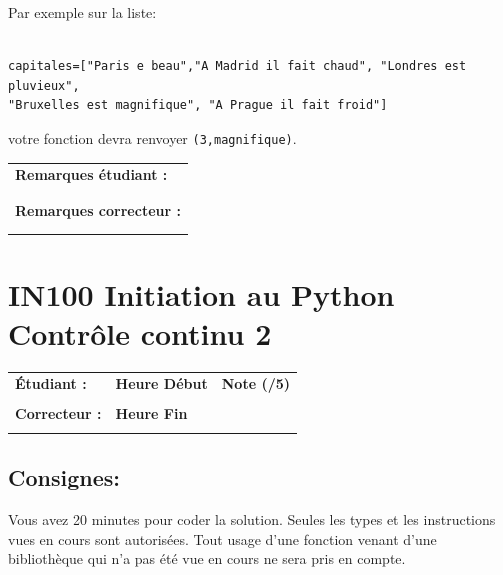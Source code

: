 \documentclass[a4paper,11pt]{article}
\begin{document}
Par exemple sur la liste:
\begin{verbatim}

capitales=["Paris e beau","A Madrid il fait chaud", "Londres est pluvieux", 
"Bruxelles est magnifique", "A Prague il fait froid"]

\end{verbatim}
votre fonction devra renvoyer \texttt{(3,magnifique)}. 

\begin{table}[h!]
\centering
\renewcommand{\arraystretch}{1.4} %
\begin{tabular}{|p{15cm}|}
\hline
\textbf{Remarques étudiant :}    \\
 \\
 \\
\hline
\textbf{Remarques correcteur :}  \\
 \\
 \\
\hline
\end{tabular}
\end{table}


\newpage


\section*{\center IN100 Initiation au Python\\
Contrôle continu 2}


\begin{table}[h!]
\centering
\renewcommand{\arraystretch}{1.4} %
\begin{tabular}{|p{10cm}|p{3cm}|p{2cm}|}
\hline
\textbf{Étudiant :} & \textbf{Heure Début }  & \textbf{Note (/5) }  \\
& & \\
\hline
\textbf{Correcteur :} & \textbf{Heure Fin } & \\
& & \\
\hline

\hline
\end{tabular}
\end{table}

\subsection*{Consignes:} Vous avez 20 minutes pour coder la solution. Seules les types et les instructions vues en cours sont autorisées. Tout usage d'une fonction 
venant d'une bibliothèque qui n'a pas été vue en cours ne sera pris en compte. 
\end{document}
